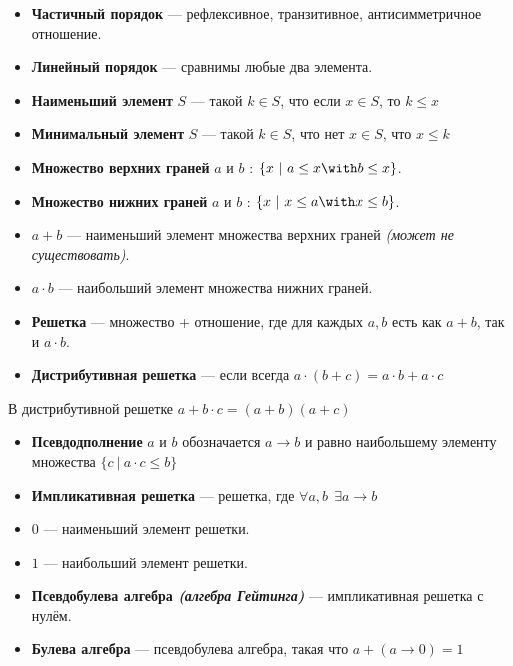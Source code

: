 \documentclass[12pt, a4paper, oneside]{book}
\begin{document}
\begin{definition}\itemfix
    \begin{itemize}
        \item \textbf{Частичный порядок} --- рефлексивное, транзитивное, антисимметричное отношение.
        \item \textbf{Линейный порядок} --- сравнимы любые два элемента.
        \item \textbf{Наименьший элемент} \(S\) --- такой \(k\in S\), что если \(x\in S\), то \(k \leq x\)
        \item \textbf{Минимальный элемент} \(S\) --- такой \(k\in S\), что нет \(x\in S\), что \(x \leq k\)
        \item \textbf{Множество верхних граней} \(a\) и \(b\) : \(\{x\ |\ a \leq x \with b \leq x\}\).
        \item \textbf{Множество нижних граней} \(a\) и \(b\) : \(\{x\ |\ x \leq a \with x \leq b\}\).
        \item \(a + b\) --- наименьший элемент множества верхних граней \textit{(может не существовать)}.
        \item \(a \cdot b\) --- наибольший элемент множества нижних граней.
        \item \textbf{Решетка} --- множество + отношение, где для каждых \(a,b\) есть как \(a + b\), так и \(a \cdot b\).
        \item \textbf{Дистрибутивная решетка} --- если всегда \(a\cdot(b + c) = a\cdot b + a\cdot c\)
    \end{itemize}
\end{definition}

\begin{lemma}
    В дистрибутивной решетке \(a + b\cdot c = (a + b)(a + c)\)
\end{lemma}

\begin{definition}\itemfix
    \begin{itemize}
        \item \textbf{Псевдодполнение} \(a\) и \(b\) обозначается \(a \to b\) и равно наибольшему элементу множества \(\{c\ |\ a\cdot c \leq b\}\)
        \item \textbf{Импликативная решетка} --- решетка, где \(\forall a, b \ \ \exists a \to b\)
        \item \(0\) --- наименьший элемент решетки.
        \item \(1\) --- наибольший элемент решетки.
        \item \textbf{Псевдобулева алгебра \textit{(алгебра Гейтинга)}} --- импликативная решетка с нулём.
        \item \textbf{Булева алгебра} --- псевдобулева алгебра, такая что \(a + (a \to 0) = 1\)
    \end{itemize}
\end{definition}
\end{document}

